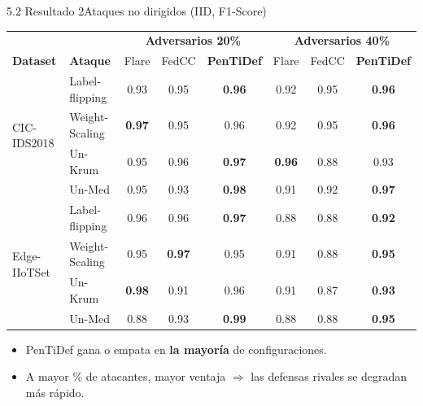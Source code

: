 \begin{frame}{5.2 Resultado 2}{Ataques no dirigidos (IID, F1-Score)}
  \begin{center}
  \scriptsize
  \begin{tabular}{@{}llccc|ccc@{}}
    \toprule
    & & \multicolumn{3}{c|}{\textbf{Adversarios 20\%}} & \multicolumn{3}{c}{\textbf{Adversarios 40\%}} \\
    \textbf{Dataset} & \textbf{Ataque} & Flare & FedCC & \textbf{PenTiDef} & Flare & FedCC & \textbf{PenTiDef} \\
    \midrule
    \multirow{4}{*}{CIC-IDS2018}
      & Label-flipping & 0.93 & 0.95 & \textbf{0.96} & 0.92 & 0.95 & \textbf{0.96} \\
      & Weight-Scaling & \textbf{0.97} & 0.95 & 0.96 & 0.92 & 0.95 & \textbf{0.96} \\
      & Un-Krum        & 0.95 & 0.96 & \textbf{0.97} & \textbf{0.96} & 0.88 & 0.93 \\
      & Un-Med         & 0.95 & 0.93 & \textbf{0.98} & 0.91 & 0.92 & \textbf{0.97} \\
    \midrule
    \multirow{4}{*}{Edge-IIoTSet}
      & Label-flipping & 0.96 & 0.96 & \textbf{0.97} & 0.88 & 0.88 & \textbf{0.92} \\
      & Weight-Scaling & 0.95 & \textbf{0.97} & 0.95 & 0.91 & 0.88 & \textbf{0.95} \\
      & Un-Krum        & \textbf{0.98} & 0.91 & 0.96 & 0.91 & 0.87 & \textbf{0.93} \\
      & Un-Med         & 0.88 & 0.93 & \textbf{0.99} & 0.88 & 0.88 & \textbf{0.95} \\
    \bottomrule
  \end{tabular}
  \end{center}
  \vfill
  \begin{itemize}\small
    \item PenTiDef gana o empata en \textbf{la mayoría} de configuraciones.
    \item A mayor \% de atacantes, mayor ventaja $\Rightarrow$ las defensas rivales se degradan más rápido.
  \end{itemize}
\end{frame}

